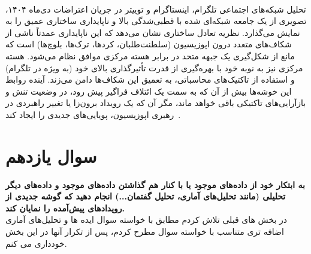 \documentclass{article}
\begin{document}
	\\
	تحلیل شبکه‌های اجتماعی تلگرام، اینستاگرام و توییتر در جریان اعتراضات دی‌ماه ۱۴۰۴، تصویری از یک جامعه شبکه‌ای شده با قطبی‌شدگی بالا و ناپایداری ساختاری عمیق را به نمایش می‌گذارد. نظریه تعادل ساختاری نشان می‌دهد که این ناپایداری عمدتاً ناشی از شکاف‌های متعدد درون اپوزیسیون (سلطنت‌طلبان، کردها، ترک‌ها، بلوچ‌ها) است که مانع از شکل‌گیری یک جبهه متحد در برابر هسته مرکزی موافق نظام می‌شود. هسته مرکزی نیز به نوبه خود با بهره‌گیری از قدرت تأثیرگذاری بالای خود (به ویژه در تلگرام) و استفاده از تاکتیک‌های محاسباتی، به تعمیق این شکاف‌ها دامن می‌زند. آینده روابط این خوشه‌ها بیش‌ از آن که به سمت یک ائتلاف فراگیر پیش رود، در وضعیت تنش و بازآرایی‌های تاکتیکی باقی خواهد ماند، مگر آن که یک رویداد برون‌زا یا تغییر راهبردی در رهبری اپوزیسیون، پویایی‌های جدیدی را ایجاد کند~\cite{chatgpt2024socialnetworkproject}.
\\
\section{سوال یازدهم}
\textbf{به ابتکار خود از داده‌های موجود یا با کنار هم گذاشتن داده‌های موجود و داده‌های دیگر تحلیلی (مانند تحلیل‌های آماری، تحلیل گفتمان...) انجام دهید که گوشه جدیدی از رویدادهای پیش‌آمده را نمایان کند.}
\\
در بخش های قبلی تلاش کردم مطابق با خواسته سوال ایده ها و تحلیل‌های آماری اضافه تری متناسب با خواسته سوال مطرح کردم، پس از تکرار آنها در این بخش خودداری می کنم.
\begin{latin}
  	

\end{latin}
\end{document}
